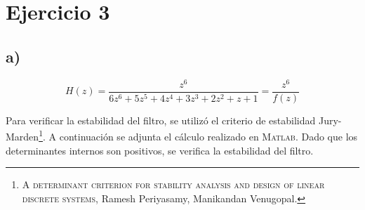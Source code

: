 \documentclass[../../guia1.tex]{subfiles}
\begin{document}
\section*{Ejercicio 3}
\subsection*{a)}

\[H(z) = \frac{z^6}{6z^6+5z^5+4z^4+3z^3+2z^2+z+1} = \frac{z^6}{f(z)}\]

Para verificar la estabilidad del filtro, se utiliz\'o el criterio de estabilidad Jury-Marden\footnote{\textsc{A determinant criterion for stability analysis and design of linear discrete systems}, Ramesh Periyasamy, Manikandan Venugopal. }. A continuaci\'on se adjunta el c\'alculo realizado en \textsc{Matlab}. Dado que los determinantes internos son positivos, se verifica la estabilidad del filtro.




\end{document}
